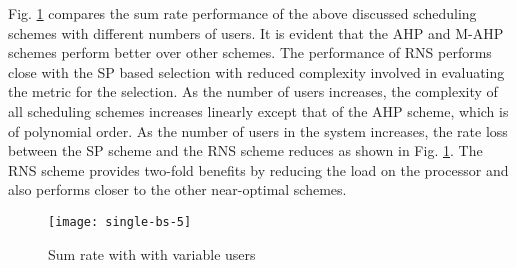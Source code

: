 Fig. \ref{single-bs-f3} compares the sum rate performance of the above discussed scheduling schemes with different numbers of users. It is evident that the \ac{AHP} and \ac{M-AHP} schemes perform better over other schemes. The performance of \ac{RNS} performs close with the SP based selection with reduced complexity involved in evaluating the metric for the selection. As the number of users increases, the complexity of all scheduling schemes increases linearly except that of the \ac{AHP} scheme, which is of polynomial order. As the number of users in the system increases, the rate loss between the \ac{SP} scheme and the \ac{RNS} scheme reduces as shown in Fig. \ref{single-bs-f3}. The \ac{RNS} scheme provides two-fold benefits by reducing the load on the processor and also performs closer to the other near-optimal schemes.
\begin{figure}
\centering
\texttt{[image: single-bs-5]}
\vspace{-0.2in}
\caption[short]{Sum rate with  with variable users}
\vspace{-0.1in}
\label{single-bs-f3}
\end{figure}
